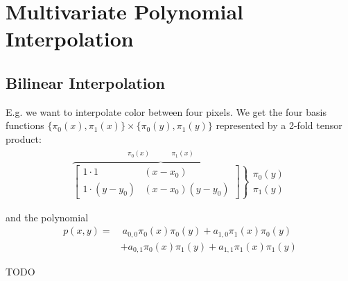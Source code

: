 \section{Multivariate Polynomial Interpolation}
\subsection{Bilinear Interpolation}

E.g. we want to interpolate color between four pixels.
We get the four basis functions $\{\pi_0(x), \pi_1(x)\} \times \{\pi_0(y), \pi_1(y)\}$
represented by a 2-fold tensor product:
\begin{align*}
	\overbrace{
		\left.
		\begin{bmatrix}
			1\cdot 1 & (x-x_0) \\
			1\cdot (y-y_0) & (x-x_0)(y-y_0)
		\end{bmatrix}
		\right\}
	}^{\begin{matrix}
		\pi_0(x) & & & & \pi_1(x)
	\end{matrix}}
	\begin{matrix}
		\pi_0(y) \\
		\pi_1(y)
	\end{matrix}
\end{align*}

and the polynomial
\begin{align*}
	p(x,y) = &\ a_{0,0}\pi_0(x)\pi_0(y)
	+ a_{1,0}\pi_1(x)\pi_0(y) \\
	\ & + a_{0,1}\pi_0(x)\pi_1(y)
	+ a_{1,1}\pi_1(x)\pi_1(y)
\end{align*}

TODO